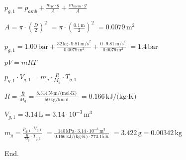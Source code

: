\( p_{g,1} = p_{amb} + \frac{m_K \cdot g}{A} + \frac{m_{mem} \cdot g}{A} \)  

\( A = \pi \cdot \left(\frac{D}{2}\right)^2 \)  
\( = \pi \cdot \left(\frac{0.1 \, \text{m}}{2}\right)^2 \)  
\( = 0.0079 \, \text{m}^2 \)  

\( p_{g,1} = 1.00 \, \text{bar} + \frac{32 \, \text{kg} \cdot 9.81 \, \text{m/s}^2}{0.0079 \, \text{m}^2} + \frac{0 \cdot 9.81 \, \text{m/s}^2}{0.0079 \, \text{m}^2} \)  
\( = 1.4 \, \text{bar} \)  

\( pV = mRT \)  

\( p_{g,1} \cdot V_{g,1} = m_g \cdot \frac{R}{M_g} \cdot T_{g,1} \)  

\( R = \frac{\bar{R}}{M_g} = \frac{8.314 \, \text{N·m/(mol·K)}}{50 \, \text{kg/kmol}} \)  
\( = 0.166 \, \text{kJ/(kg·K)} \)  

\( V_{g,1} = 3.14 \, \text{L} = 3.14 \cdot 10^{-3} \, \text{m}^3 \)  

\( m_g = \frac{p_{g,1} \cdot V_{g,1}}{\frac{R}{M_g} \cdot T_{g,1}} \)  
\( = \frac{140 \, \text{kPa} \cdot 3.14 \cdot 10^{-3} \, \text{m}^3}{0.166 \, \text{kJ/(kg·K)} \cdot 773.15 \, \text{K}} \)  
\( = 3.422 \, \text{g} = 0.00342 \, \text{kg} \)  

End.
